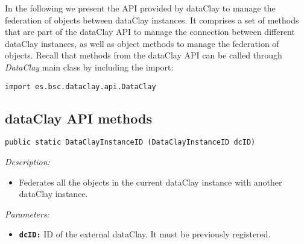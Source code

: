 In the following we present the API provided by dataClay to manage the federation of objects between dataClay instances. It comprises a set of methods that are part of the dataClay API to manage the connection between different dataClay instances, as well as object methods to manage the federation of objects. Recall that methods from the dataClay API can be called through \textit{DataClay} main class by including the import:

\colorbox{basecolor!20}{\texttt{import es.bsc.dataclay.api.DataClay}}

\subsection{dataClay API methods}
\label{sec:JavaFederationAPI}


\begin{dBox}
\texttt{public static DataClayInstanceID (DataClayInstanceID dcID)}
\LINE

{\it Description:}

\begin{itemize}
  \item Federates all the objects in the current dataClay instance with another dataClay instance. 
\end{itemize}

{\it Parameters:}

\begin{itemize}
  \item \texttt{\bfseries dcID:} ID of the external dataClay. It must be previously registered.
\end{itemize}

\end{dBox}


